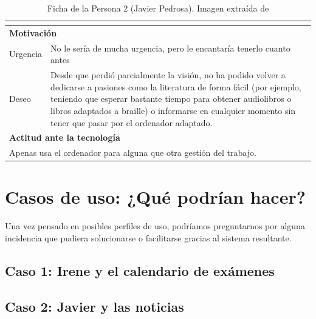 \begin{table}[H]
\begin{tabular}{|l|l|l|}
{		}                \\ 
		\hline
		\multicolumn{3}{|l|}{\cellcolor{lightblue}\textbf{Motivación}}                   \\ 
		\hline
		Urgencia     & \multicolumn{2}{l|}{
			\begin{minipage}[t]{0.7\textwidth}
				No le sería de mucha urgencia, pero le encantaría tenerlo cuanto antes
			\end{minipage}
		}                \\ 
		\hline
		Deseo        & \multicolumn{2}{l|}{
			\begin{minipage}[t]{0.7\textwidth}
				Desde que perdió parcialmente la visión, no ha podido volver a dedicarse a pasiones como la literatura de forma fácil (por ejemplo, teniendo que esperar bastante tiempo para obtener audiolibros o libros adaptados a braille) o informarse en cualquier momento sin tener que pasar por el ordenador adaptado.
			\end{minipage}
		}                \\ 
		\hline
		\multicolumn{3}{|l|}{\cellcolor{lightblue}\textbf{Actitud ante la tecnología}}    \\ 
		\hline
		\multicolumn{3}{|l|}{
			\begin{minipage}[t]{\textwidth}
				Apenas usa el ordenador para alguna que otra gestión del trabajo.
			\end{minipage}
		}                              \\
		\hline
	\end{tabular}
	\caption[Ficha Persona 2]{Ficha de la Persona 2 (Javier Pedrosa). Imagen extraída de \cite{thispersondoesnotexist}}
\end{table}

\newpage

\section{Casos de uso: ¿Qué podrían hacer?}

Una vez pensado en posibles perfiles de uso, podríamos preguntarnos por alguna incidencia que pudiera solucionarse o facilitarse gracias al sistema resultante.

\subsection{Caso 1: Irene y el calendario de exámenes}

\subsection{Caso 2: Javier y las noticias}

